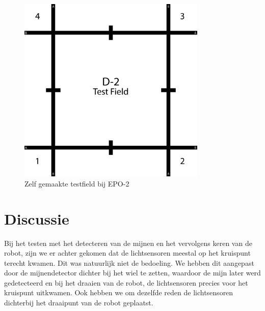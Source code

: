 \documentclass{report}
\begin{document}
\begin{figure}[H]
	\centering
	\includegraphics[width=0.8\textwidth]{d-2_test_field.png}
	\caption{Zelf gemaakte testfield  bij EPO-2}
	\label{fig:testfield}
\end{figure}

\section{Discussie}
Bij het testen met het detecteren van de mijnen en het vervolgens keren van de robot, zijn we er achter gekomen dat de lichtsensoren meestal op het kruispunt terecht kwamen. Dit was natuurlijk niet de bedoeling. We hebben dit aangepast door de mijnendetector dichter bij het wiel te zetten, waardoor de mijn later werd gedetecteerd en bij het draaien van de robot, de lichtsensoren precies voor het kruispunt uitkwamen. Ook hebben we om dezelfde reden de lichtsensoren dichterbij het draaipunt van de robot geplaatst.
\end{document}
